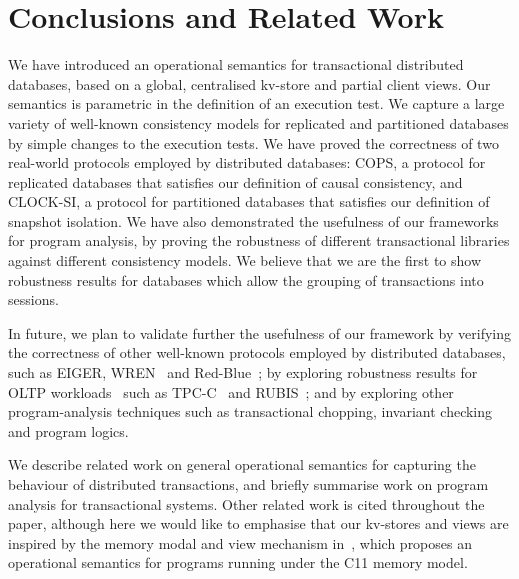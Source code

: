 \section{Conclusions and Related Work}

We have introduced  an  operational semantics for 
transactional distributed databases, based on a global, centralised 
kv-store and partial client views. 
Our semantics is parametric in the definition of an execution test.
We capture a large variety of well-known consistency models 
for replicated and partitioned databases by simple changes to  the execution tests. 
We have proved the correctness of two real-world protocols employed by distributed 
databases: COPS, a 
protocol for replicated databases that satisfies our definition of causal consistency, 
and CLOCK-SI, a protocol for partitioned databases that satisfies our
definition of 
snapshot isolation. We have also demonstrated the usefulness of our frameworks 
for program analysis, by proving the robustness of different transactional 
libraries against different consistency models. We believe that we are
the first to show robustness results for  databases which  allow
the grouping of  transactions into sessions. 

In future, we plan to validate further the usefulness of our framework
by verifying the correctness of other well-known protocols employed by
distributed databases, such as EIGER\cite{.}, WREN~\cite{.} and
Red-Blue~\cite{.}; by exploring robustness results for OLTP
workloads~\cite{.}  such as TPC-C~\cite{.} and RUBIS~\cite{.};
and by exploring other program-analysis techniques such as
transactional chopping, invariant checking and program
logics. 



We describe related work  on general operational semantics
for capturing the behaviour of distributed transactions, and 
briefly summarise work on program analysis for transactional
systems. Other related work is cited throughout the paper, although
here we
would like to emphasise that our kv-stores and views are inspired by the
memory modal and view mechanism in~\cite{.}, 
which proposes an operational semantics for programs running under the C11 memory model.



